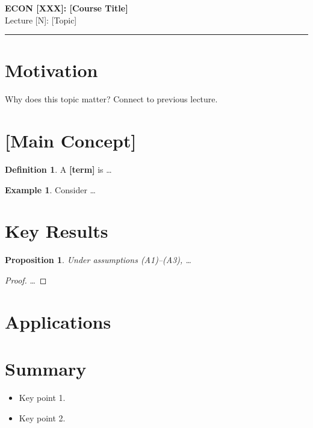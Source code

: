 \documentclass[11pt]{article}
\newtheorem{proposition}[theorem]{Proposition}
\theoremstyle{definition}
\newtheorem{definition}[theorem]{Definition}
\newtheorem{example}[theorem]{Example}
\theoremstyle{remark}
\newcommand{\COURSE}{ECON [XXX]}
\newcommand{\COURSETITLE}{[Course Title]}
\newcommand{\LECTURENUM}{[N]}
\newcommand{\LECTURETOPIC}{[Topic]}
\begin{document}
\begin{center}
  {\LARGE\bfseries \COURSE: \COURSETITLE}\\[0.4em]
  {\large Lecture \LECTURENUM: \LECTURETOPIC}
\end{center}
\medskip\hrule\medskip

\section{Motivation}

Why does this topic matter? Connect to previous lecture.

\section{[Main Concept]}

\begin{definition}
  A \textbf{[term]} is \ldots
\end{definition}

\begin{example}
  Consider \ldots
\end{example}

\section{Key Results}

\begin{proposition}
  Under assumptions (A1)--(A3), \ldots
\end{proposition}

\begin{proof}
  \ldots
\end{proof}

\section{Applications}

\section{Summary}

\begin{itemize}
  \item Key point 1.
  \item Key point 2.
\end{itemize}
\end{document}
